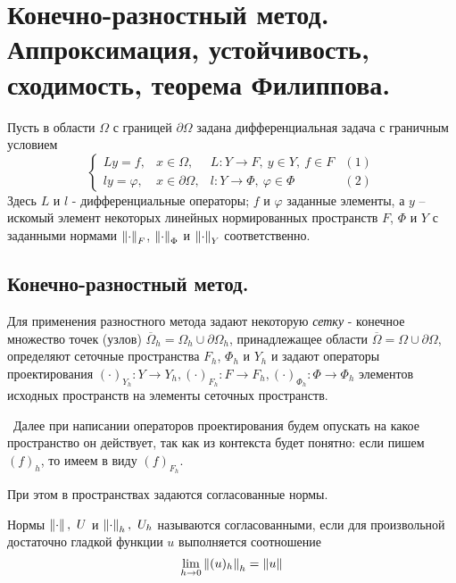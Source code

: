 \section[Конечно-разностный метод. Аппроксимация, устойчивость, сходимость, теорема Филиппова.]{Конечно-разностный метод. Аппроксимация, устойчивость, \\ сходимость, теорема Филиппова.}

Пусть в области $\Omega$ с границей $\partial\Omega$ задана
дифференциальная задача с граничным условием
\[\left\{\begin{array}{cccc}
    Ly=f,       & x\in\Omega,          & L: Y\rightarrow F,\ y\in Y,\ f\in F   & (1) \\
    ly=\varphi, & x\in \partial\Omega, & l: Y\rightarrow \Phi,\ \varphi\in\Phi & (2)
  \end{array}\right.\]
Здесь $L$ и $l$ - дифференциальные операторы; $f$ и $\varphi$
заданные элементы, а $y$ -- искомый элемент некоторых линейных
нормированных пространств $F$, $\Phi$ и $Y$ с заданными нормами
$\left\lVert\cdot\right\rVert_{F}$, $\left\lVert\cdot\right\rVert_{\Phi}$ и $\left\lVert\cdot\right\rVert_{Y}$
соответственно.

\subsection*{Конечно-разностный метод.}
Для применения разностного метода задают некоторую \textit{сетку} -
конечное множество точек (узлов) $\overline{\Omega}_h=\Omega_h\cup\partial\Omega_h$,
принадлежащее области $\overline{\Omega}=\Omega\cup\partial\Omega$,
определяют сеточные пространства $F_h$, $\Phi_h$ и $Y_h$ и
задают операторы проектирования $(\cdot)_{Y_h}:Y\rightarrow Y_h,(\cdot)_{F_h}:F\rightarrow F_h,(\cdot)_{\Phi_h}:\Phi\rightarrow \Phi_h$ элементов
исходных пространств на элементы сеточных пространств.

\textbullet\  Далее при написании операторов проектирования будем опускать на какое пространство он действует,
так как из контекста будет понятно: если пишем $(f)_h$, то имеем в виду $(f)_{F_h}$.

При этом в пространствах задаются согласованные нормы.

\begin{definition}
  Нормы $\left\lVert\cdot\right\rVert,\ U$ и $\left\lVert\cdot\right\rVert_h,\ U_h$
  называются согласованными, если для произвольной достаточно
  гладкой функции $u$ выполняется соотношение
  \[\lim\limits_{h\rightarrow0}\left\lVert(u)_h\right\rVert_h=\left\lVert u\right\rVert\]
\end{definition}


